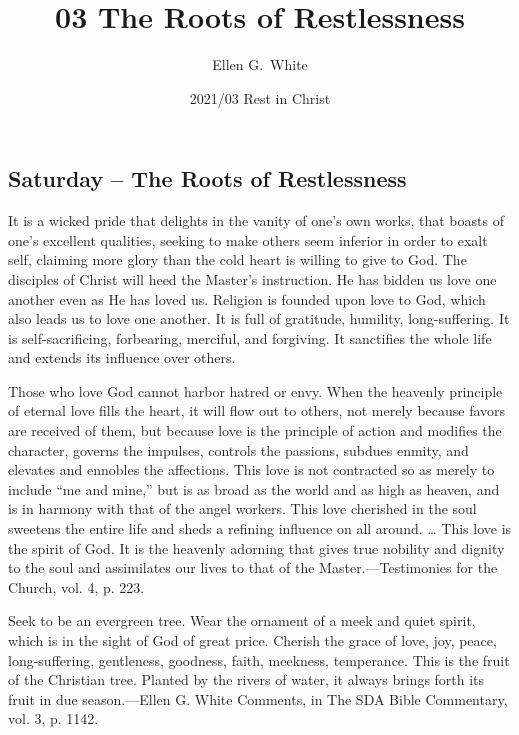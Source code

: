 \documentclass[a4paper, 10pt, twoside, headings=small]{scrartcl}
\title{03 The Roots of Restlessness}
\author{Ellen G.\ White}
\date{2021/03 Rest in Christ}
\begin{document}
\maketitle

\thispagestyle{empty}

\pagestyle{fancy}

\begin{multicols}{2}

\section*{Saturday – The Roots of Restlessness}

It is a wicked pride that delights in the vanity of one’s own works, that boasts of one’s excellent qualities, seeking to make others seem inferior in order to exalt self, claiming more glory than the cold heart is willing to give to God. The disciples of Christ will heed the Master’s instruction. He has bidden us love one another even as He has loved us. Religion is founded upon love to God, which also leads us to love one another. It is full of gratitude, humility, long-suffering. It is self-sacrificing, forbearing, merciful, and forgiving. It sanctifies the whole life and extends its influence over others.

Those who love God cannot harbor hatred or envy. When the heavenly principle of eternal love fills the heart, it will flow out to others, not merely because favors are received of them, but because love is the principle of action and modifies the character, governs the impulses, controls the passions, subdues enmity, and elevates and ennobles the affections. This love is not contracted so as merely to include “me and mine,” but is as broad as the world and as high as heaven, and is in harmony with that of the angel workers. This love cherished in the soul sweetens the entire life and sheds a refining influence on all around. … This love is the spirit of God. It is the heavenly adorning that gives true nobility and dignity to the soul and assimilates our lives to that of the Master.—Testimonies for the Church, vol. 4, p. 223.

Seek to be an evergreen tree. Wear the ornament of a meek and quiet spirit, which is in the sight of God of great price. Cherish the grace of love, joy, peace, long-suffering, gentleness, goodness, faith, meekness, temperance. This is the fruit of the Christian tree. Planted by the rivers of water, it always brings forth its fruit in due season.—Ellen G. White Comments, in The SDA Bible Commentary, vol. 3, p. 1142.


\end{multicols}
\end{document}
